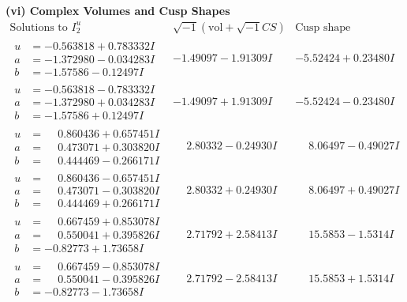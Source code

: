 \documentclass[1p]{elsarticle_modified}
\theoremstyle{definition}
\newcommand{\I}{\sqrt{-1}}
\begin{document}
\newpage\flushleft \textbf{(vi) Complex Volumes and Cusp Shapes}
$$\begin{array}{c|c|c}  
\text{Solutions to }I^u_{2}& \I (\text{vol} + \sqrt{-1}CS) & \text{Cusp shape}\\
 \hline 
\begin{aligned}
u &= -0.563818 + 0.783332 I \\
a &= -1.372980 - 0.034283 I \\
b &= -1.57586 - 0.12497 I\end{aligned}
 & -1.49097 - 1.91309 I & -5.52424 + 0.23480 I \\ \hline\begin{aligned}
u &= -0.563818 - 0.783332 I \\
a &= -1.372980 + 0.034283 I \\
b &= -1.57586 + 0.12497 I\end{aligned}
 & -1.49097 + 1.91309 I & -5.52424 - 0.23480 I \\ \hline\begin{aligned}
u &= \phantom{-}0.860436 + 0.657451 I \\
a &= \phantom{-}0.473071 + 0.303820 I \\
b &= \phantom{-}0.444469 - 0.266171 I\end{aligned}
 & \phantom{-}2.80332 - 0.24930 I & \phantom{-}8.06497 - 0.49027 I \\ \hline\begin{aligned}
u &= \phantom{-}0.860436 - 0.657451 I \\
a &= \phantom{-}0.473071 - 0.303820 I \\
b &= \phantom{-}0.444469 + 0.266171 I\end{aligned}
 & \phantom{-}2.80332 + 0.24930 I & \phantom{-}8.06497 + 0.49027 I \\ \hline\begin{aligned}
u &= \phantom{-}0.667459 + 0.853078 I \\
a &= \phantom{-}0.550041 + 0.395826 I \\
b &= -0.82773 + 1.73658 I\end{aligned}
 & \phantom{-}2.71792 + 2.58413 I & \phantom{-}15.5853 - 1.5314 I \\ \hline\begin{aligned}
u &= \phantom{-}0.667459 - 0.853078 I \\
a &= \phantom{-}0.550041 - 0.395826 I \\
b &= -0.82773 - 1.73658 I\end{aligned}
 & \phantom{-}2.71792 - 2.58413 I & \phantom{-}15.5853 + 1.5314 I \\ \hline\begin{aligned}

\end{aligned}
\end{array}$$
\end{document}

